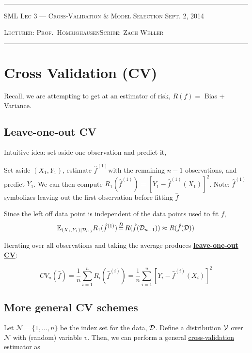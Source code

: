 \documentclass[10pt]{article}
\newcommand{\lecture}{Prof.\ Homrighausen}
\newcommand{\scribe}{Zach Weller}
\newcommand{\chtitle}{Cross-Validation \& Model Selection}
\newcommand{\lecdate}{Sept. 2, 2014}
\begin{document}
\rule{6.5in}{1pt}

\textsc{SML
  \hfill  Lec 3 --- \chtitle
  \hfill \lecdate}

\textsc{Lecturer: \lecture \hfill Scribe: \scribe}
\rule{6.5in}{1pt}

\section{Cross Validation (CV)}

Recall, we are attempting to get at an estimator of risk, $R(f) = $ Bias + Variance.

	\subsection{Leave-one-out CV}
		Intuitive idea: set aside one observation and predict it, 
		
		\begin{example} Set aside $(X_1, Y_1)$, estimate $\hat{f}^{(1)}$with the remaining $n - 1$ observations, and predict $Y_1$. We can then compute $R_1(\hat{f}^{(1)}) = [ Y_1 - \hat{f}^{(1)}(X_1)]^2$. 	
		Note: $\hat{f}^{(1)}$ symbolizes leaving out the first observation before fitting $\hat{f}$
		\end{example}
	
	Since the left off data point is \underline{independent} of the data points used to fit $f$, 
	\begin{equation}
		\E_{(X_1,Y_1)|\data_{(1)}}R_1(\hat{f}^{(1)}) \,{\buildrel D \over =}\, R(\hat{f}(\data_{n-1})) \approx R(\hat{f}(\data))
	\end{equation}
	
	Iterating over all observations and taking the average produces \underline{\textbf{leave-one-out CV}}:
	
		\begin{equation}
			CV_{n}(\hat{f}) = \frac{1}{n} \sum_{i=1}^{n} R_i(\hat{f}^{(i)}) = \frac{1}{n} \sum_{i=1}^{n}  [ Y_i - \hat{f}^{(i)}(X_i)]^2
		\end{equation}
		
		
		
	\subsection{More general CV schemes}
	Let $\mathcal{N} = \{1,\ldots, n\}$ be the index set for the data, $\mathcal{D}$. Define a distribution $\mathcal{V}$ over $\mathcal{N}$ with (random) variable $v$. Then, we can perform a general \underline{cross-validation} estimator as
	
\end{document}
